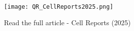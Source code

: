 \documentclass[xcolor={table}]{beamer}
\begin{document}
\begin{frame}[fragile=singleslide]
\begin{columns}[onlytextwidth,T]
\begin{column}{.64\textwidth}
\printbibliography
\end{column}
\begin{column}{.30\textwidth}
\begin{sidefigure}
    \centering
\texttt{[image: QR\_CellReports2025.png]}
\caption{Read the full article - Cell Reports (2025)}
\end{sidefigure}
\end{column}
\end{columns}
\vfill
\end{frame}
\end{document}
